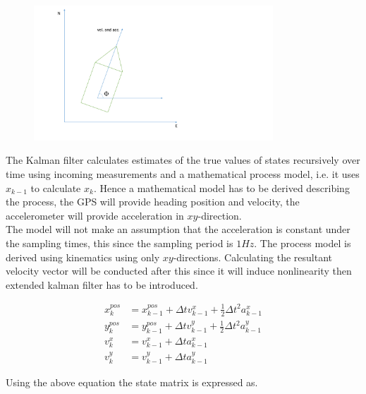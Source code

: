 \begin{figure}[H]
\centering
\includegraphics[width=0.8\textwidth]{Figures/b_t.pdf}
\caption{}
\label{bat}
\end{figure}

The Kalman filter calculates estimates of the true values of states recursively over time using incoming measurements and a mathematical process model, i.e. it uses $x_{k-1}$ to calculate $x_k$. Hence a mathematical model has to be derived describing the process, the GPS will provide heading position and velocity, the accelerometer will provide acceleration in $xy$-direction.\\
The model will not make an assumption that the acceleration is constant under the sampling times, this since the sampling period is $1Hz$. The process model is derived using kinematics using only $xy$-directions. Calculating the resultant velocity vector will be conducted after this since it will induce nonlinearity then extended kalman filter has to be introduced.

\begin{align}
x^{pos}_{k}&=x^{pos}_{k-1}+\Delta tv^{x}_{k-1}+\frac{1}{2}\Delta t^2a^x_{k-1}\\
y^{pos}_{k}&=y^{pos}_{k-1}+\Delta tv^{y}_{k-1}+\frac{1}{2}\Delta t^2a^y_{k-1}\\
v^{x}_{k}&=v^{x}_{k-1}+\Delta ta^x_{k-1}\\
v^{y}_{k}&=v^{y}_{k-1}+\Delta ta^y_{k-1}
\end{align}

Using the above equation the state matrix is expressed as.

